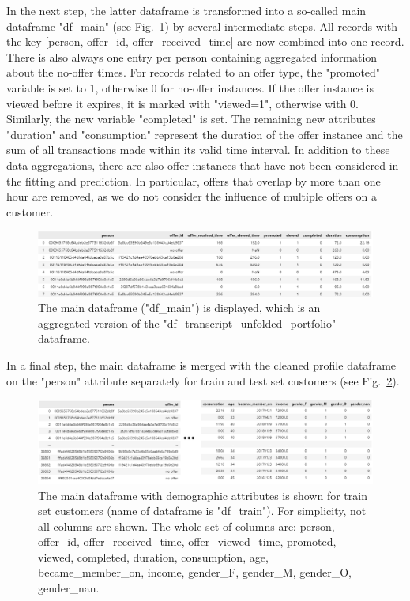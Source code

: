 \documentclass[11pt]{article} %
\begin{document}
In the next step, the latter dataframe is transformed into a so-called main dataframe "df\_main" (see Fig.~\ref{implementation step1.3}) by several intermediate steps.
All records with the key [person, offer\_id, offer\_received\_time] are now combined into one record.
There is also always one entry per person containing aggregated information about the no-offer times.
For records related to an offer type, the "promoted" variable is set to 1, otherwise 0 for no-offer instances.
If the offer instance is viewed before it expires, it is marked with "viewed=1", otherwise with 0.
Similarly, the new variable "completed" is set.
The remaining new attributes "duration" and "consumption" represent the duration of the offer instance and the sum of all transactions made within its valid time interval.
In addition to these data aggregations, there are also offer instances that have not been considered in the fitting and prediction.
In particular, offers that overlap by more than one hour are removed, as we do not consider the influence of multiple offers on a customer.

\begin{figure}[H]
\centering
\includegraphics[width=0.97 \textwidth]{pics/main_dataframe.png}
\caption{\label{implementation step1.3}The main dataframe ("df\_main") is displayed, which is an aggregated version of the "df\_transcript\_unfolded\_portfolio" dataframe. }
\end{figure}
In a final step, the main dataframe is merged with the cleaned profile dataframe on the "person" attribute separately for train and test set customers (see Fig.~\ref{implementation step1.4}).

\begin{figure}[H]
\centering
\includegraphics[width=0.97 \textwidth]{pics/main_dataframe_train.png}
\caption{\label{implementation step1.4}The main dataframe with demographic attributes is shown for train set customers (name of dataframe is "df\_train"). For simplicity, not all columns are shown. The whole set of columns are: person, offer\_id, offer\_received\_time, offer\_viewed\_time, promoted, viewed, completed, duration, consumption, age, became\_member\_on, income, gender\_F, gender\_M, gender\_O, gender\_nan. }
\end{figure}
\end{document}
